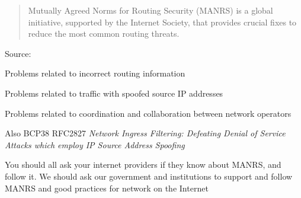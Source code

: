 \documentclass[Screen16to9,17pt]{foils}
\begin{document}
\begin{quote}
  Mutually Agreed Norms for Routing Security (MANRS) is a global initiative, supported by the Internet Society, that provides crucial fixes to reduce the most common routing threats. ﻿
\end{quote}
Source: {\small{}}

\begin{list2}
\item Problems related to incorrect routing information
\item Problems related to traffic with spoofed source IP addresses
\item Problems related to coordination and collaboration between network operators
\item Also BCP38 RFC2827 \emph{Network Ingress Filtering: Defeating Denial of Service Attacks
which employ IP Source Address Spoofing}
\end{list2}

You should all ask your internet providers if they know about MANRS, and follow it. We should ask our government and institutions to support and follow MANRS and good practices for network on the Internet
\end{document}
